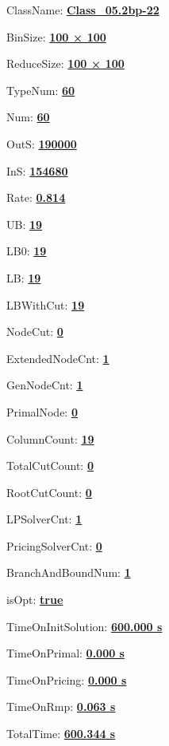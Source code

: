 \documentclass[11pt]{article}
\begin{document}
\pagestyle{empty}


ClassName: \underline{\textbf{Class_05.2bp-22}}
\par
BinSize: \underline{\textbf{100 × 100}}
\par
ReduceSize: \underline{\textbf{100 × 100}}
\par
TypeNum: \underline{\textbf{60}}
\par
Num: \underline{\textbf{60}}
\par
OutS: \underline{\textbf{190000}}
\par
InS: \underline{\textbf{154680}}
\par
Rate: \underline{\textbf{0.814}}
\par
UB: \underline{\textbf{19}}
\par
LB0: \underline{\textbf{19}}
\par
LB: \underline{\textbf{19}}
\par
LBWithCut: \underline{\textbf{19}}
\par
NodeCut: \underline{\textbf{0}}
\par
ExtendedNodeCnt: \underline{\textbf{1}}
\par
GenNodeCnt: \underline{\textbf{1}}
\par
PrimalNode: \underline{\textbf{0}}
\par
ColumnCount: \underline{\textbf{19}}
\par
TotalCutCount: \underline{\textbf{0}}
\par
RootCutCount: \underline{\textbf{0}}
\par
LPSolverCnt: \underline{\textbf{1}}
\par
PricingSolverCnt: \underline{\textbf{0}}
\par
BranchAndBoundNum: \underline{\textbf{1}}
\par
isOpt: \underline{\textbf{true}}
\par
TimeOnInitSolution: \underline{\textbf{600.000 s}}
\par
TimeOnPrimal: \underline{\textbf{0.000 s}}
\par
TimeOnPricing: \underline{\textbf{0.000 s}}
\par
TimeOnRmp: \underline{\textbf{0.063 s}}
\par
TotalTime: \underline{\textbf{600.344 s}}
\par
\newpage


\end{document}
